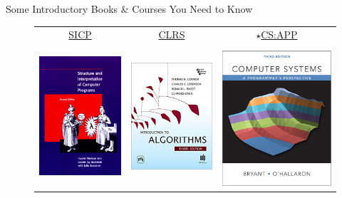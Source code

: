 \documentclass{../TexTemplate/myslide}
\begin{document}
\begin{frame}{Some Introductory Books \& Courses You Need to Know}
\begin{figure}
\begin{tabular}{ccc}
\href{https://mitpress.mit.edu/sites/default/files/sicp/full-text/book/book.html}{SICP} & \href{https://en.wikipedia.org/wiki/Introduction_to_Algorithms}{CLRS} & \href{https://csapp.cs.cmu.edu/}{$\star$CS:APP}\\
\includegraphics[width=0.3\linewidth]{fig/sicp.jpg} &
\includegraphics[width=0.3\linewidth]{fig/clrs.jpg} &
\includegraphics[width=0.3\linewidth]{fig/csapp.jpg}
\end{tabular}
\end{figure}
\end{frame}
\end{document}
